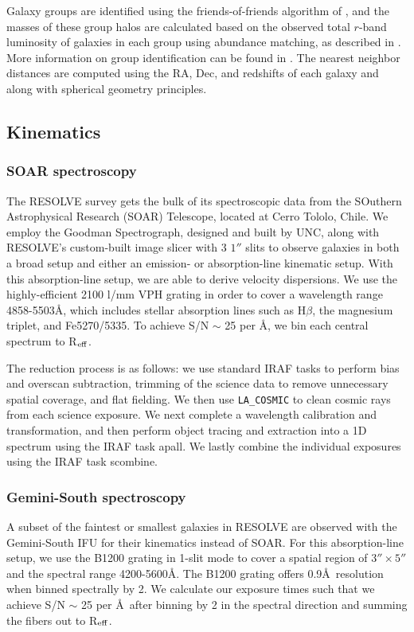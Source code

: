 \documentclass[iop,apj]{emulateapj}
\newcommand{\Reff}{R$_{\rm eff}$}
\begin{document}
Galaxy groups are identified using the friends-of-friends algorithm of \citet{Berlind2006}, and the masses of these group halos are calculated based on the observed total $r$-band luminosity of galaxies in each group using abundance matching, as described in \citet{Blanton2007}. More information on group identification can be found in \citet{Moffett2015}. The nearest neighbor distances are computed using the RA, Dec, and redshifts of each galaxy and along with spherical geometry principles. 

\subsection{Kinematics}
\label{kindata}

\subsubsection{SOAR spectroscopy}
\noindent The RESOLVE survey gets the bulk of its spectroscopic data from the SOuthern Astrophysical Research (SOAR) Telescope, located at Cerro Tololo, Chile. We employ the Goodman Spectrograph, designed and built by UNC, along with RESOLVE's custom-built image slicer with 3 $1''$ slits to observe galaxies in both a broad setup and either an emission- or absorption-line kinematic setup. With this absorption-line setup, we are able to derive velocity dispersions. We use the highly-efficient 2100 l/mm VPH grating in order to cover a wavelength range 4858-5503\AA, which includes stellar absorption lines such as H$\beta$, the magnesium triplet, and Fe5270/5335. To achieve S/N $\sim$ 25 per \AA, we bin each central spectrum to \Reff.

The reduction process is as follows: we use standard IRAF tasks to perform bias and overscan subtraction, trimming of the science data to remove unnecessary spatial coverage, and flat fielding. We then use \texttt{LA\_COSMIC} \citep{vanDokkum2001} to clean cosmic rays from each science exposure. We next complete a wavelength calibration and transformation, and then perform object tracing and extraction into a 1D spectrum using the IRAF task apall. We lastly combine the individual exposures using the IRAF task scombine.

\subsubsection{Gemini-South spectroscopy}

\noindent A subset of the faintest or smallest galaxies in RESOLVE are observed with the Gemini-South IFU for their kinematics instead of SOAR. For this absorption-line setup, we use the B1200 grating in 1-slit mode to cover a spatial region of $3''\times5''$ and the spectral range 4200-5600\AA. The B1200 grating offers 0.9\AA\ resolution when binned spectrally by 2. We calculate our exposure times such that we achieve S/N $\sim$ 25 per \AA\, after binning by 2 in the spectral direction and summing the fibers out to \Reff.
\end{document}
